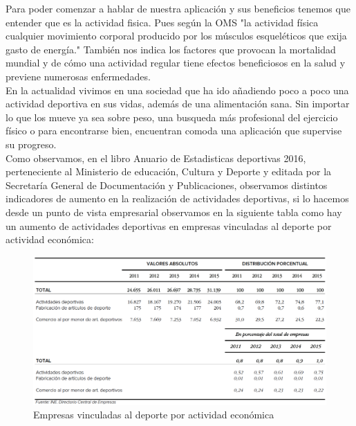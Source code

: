 \documentclass[a4paper, 11pt]{article}
\begin{document}
      Para poder comenzar a hablar de nuestra aplicación y sus beneficios tenemos
      que entender que es la actividad fisica. Pues según la OMS "la actividad
      física cualquier movimiento corporal producido por los músculos esqueléticos
      que exija gasto de energía." También nos indica los factores que provocan
      la mortalidad mundial y de cómo una actividad regular tiene efectos
      beneficiosos en la salud y previene numerosas enfermedades.\\


      En la actualidad vivimos en una sociedad que ha ido añadiendo poco a poco
      una actividad deportiva en sus vidas, además de una alimentación sana. Sin
      importar lo que los mueve ya sea sobre peso, una busqueda más profesional
      del ejercicio físico o para encontrarse bien, encuentran comoda una
      aplicación que supervise su progreso. \\

      Como observamos, en el libro Anuario de Estadisticas deportivas 2016,
      perteneciente al Ministerio de educación, Cultura y Deporte y editada por
      la Secretaría General de Documentación y Publicaciones, observamos
      distintos indicadores de aumento en la realización de actividades
      deportivas, si lo hacemos desde un punto de vista empresarial observamos
      en la siguiente tabla como hay un aumento de actividades deportivas en
      empresas vinculadas al deporte por actividad económica:\\

      \begin{figure}[H]
          \centering
          \includegraphics[width=1\textwidth]{empresas-vinculadas-al-deporte-por-actividad-economica}
          \caption{Empresas vinculadas al deporte por actividad económica}
          \label{f:empresas}
      \end{figure}
\end{document}
